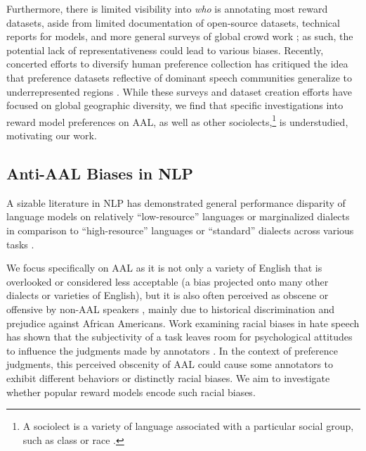 Furthermore, there is limited visibility into \textit{who} is annotating most reward datasets, aside from limited documentation of open-source datasets, technical reports for models, and more general surveys of global crowd work \cite{casper_open_2023, posch_characterizing_2022}; as such, the potential lack of representativeness could lead to various biases. Recently, concerted efforts to diversify human preference collection has critiqued the idea that preference datasets reflective of dominant speech communities generalize to underrepresented regions \cite{kirk_prism_2024}. While these surveys and dataset creation efforts have focused on global geographic diversity, we find that specific investigations into reward model preferences on AAL, as well as other sociolects,\footnote{A sociolect is a variety of language associated with a particular social group, such as class or race \cite{wolfram2004varieties}.} is understudied, motivating our work.

\subsection{Anti-AAL Biases in NLP}
A sizable literature in NLP has demonstrated general performance disparity of language models on relatively ``low-resource'' languages or marginalized dialects in comparison to ``high-resource'' languages or ``standard'' dialects across various tasks \cite{bang_multitask_2023, jiao_is_2023, robinson_chatgpt_2023, hendy_how_2023, kantharuban_quantifying_2023, fleisig2024linguisticbiaschatgptlanguage,  harris_modeling_2024}. 

We focus specifically on AAL as it is not only a variety of English that is overlooked or considered less acceptable (a bias projected onto many other dialects or varieties of English), but it is also often perceived as obscene or offensive by non-AAL speakers \cite{spears1998}, mainly due to historical discrimination and prejudice against African Americans. Work examining racial biases in hate speech has shown that the subjectivity of a task leaves room for psychological attitudes to influence the judgments made by annotators \cite{sap_annotators_2022}. In the context of preference judgments, this perceived obscenity of AAL could cause some annotators to exhibit different behaviors or distinctly racial biases. We aim to investigate whether popular reward models encode such racial biases.

